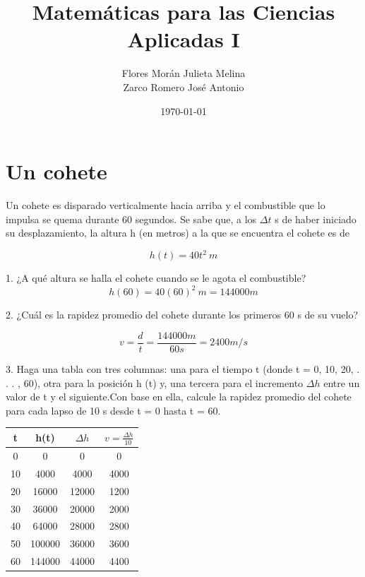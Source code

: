 \documentclass[12pt]{article}
\title{Matemáticas para las Ciencias Aplicadas I}
\date{\today}
\author{Flores Morán Julieta Melina \\ Zarco Romero José Antonio}
\begin{document}
\maketitle

\section{Un cohete}
Un cohete es disparado verticalmente hacia arriba y el combustible que lo impulsa se quema durante 60 segundos. Se sabe que, a los $\Delta t$ s de haber iniciado su desplazamiento, la altura h (en metros) a la que se encuentra el cohete es de 

\[h (t) = 40 t^2 ~ m\]

1. ¿A qué altura se halla el cohete cuando se le agota el combustible?
\[h (60) = 40 (60)^2 ~ m = 144000m\]

2. ¿Cuál es la rapidez promedio del cohete durante los primeros 60 s de su vuelo?

\[
v = \frac{d}{t} = \frac{ 144000m}{60s} =  2400 m/s
\]

3. Haga una tabla con tres columnas: una para el tiempo t (donde t = 0, 10, 20, . . . , 60), otra para la posición h (t) y, una tercera para el incremento $\Delta h$ entre un valor de t y el siguiente.Con base en ella, calcule la rapidez promedio del cohete para cada lapso de 10 s desde t = 0 hasta t = 60.\\
\begin{tabular}{||c c c c||} 
 \hline
 t & h(t) &  $\Delta h$  & $v =\frac{\Delta h}{10}$ \\ [0.5ex] 
 \hline\hline
 0	& 0 & 0 & 0\\
10 & 	4000 &	4000 &	4000 \\
20	& 16000 &	12000	& 1200 \\
30 & 	36000	& 20000	& 2000 \\
40 & 	64000	& 28000 &	2800 \\
50	& 100000 & 	36000 &	3600 \\
60 & 	144000	& 44000	& 4400 \\ [1ex] 
\hline
\end{tabular}
\\
\end{document}
